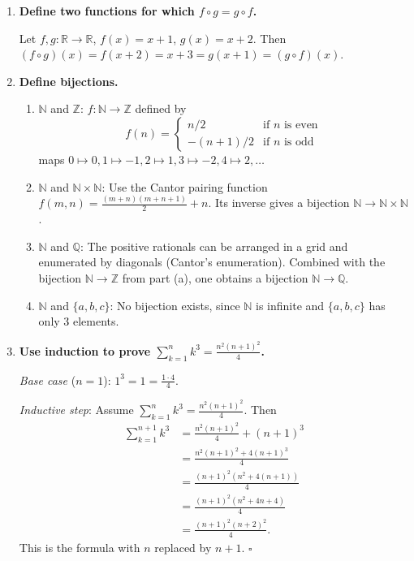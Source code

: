 \documentclass[11pt,openany]{book}
\def\NN{\mathbb{N}}
\def\RN{\mathbb{R}}
\def\ZN{\mathbb{Z}}
\def\QN{\mathbb{Q}}
\begin{document}
\begin{enumerate}[{0.}1. ]
Let $z \in Z$. Since $g$ is surjective, $\exists y \in Y$ with $g(y)=z$. Since $f$ is surjective, $\exists x \in X$ with $f(x)=y$. Then $(g\circ f)(x)=g(f(x))=g(y)=z$.

\item \textbf{Define two functions for which $f\circ g = g\circ f$.}

Let $f,g: \RN \to \RN$, $f(x) = x+1$, $g(x) = x+2$. Then $(f\circ g)(x) = f(x+2)=x+3 = g(x+1) = (g\circ f)(x)$.

\item \textbf{Define bijections.}

\begin{enumerate}
\item $\NN$ and $\ZN$: $f: \NN \to \ZN$ defined by
\[ f(n) = \begin{cases} n/2 & \text{if } n \text{ is even}\\ -(n+1)/2 & \text{if } n \text{ is odd}\end{cases} \]
maps $0\mapsto 0, 1\mapsto -1, 2\mapsto 1, 3\mapsto -2, 4\mapsto 2,\ldots$

\item $\NN$ and $\NN\times\NN$: Use the Cantor pairing function $f(m,n) = \frac{(m+n)(m+n+1)}{2}+n$. Its inverse gives a bijection $\NN \to \NN\times\NN$.

\item $\NN$ and $\QN$: The positive rationals can be arranged in a grid and enumerated by diagonals (Cantor's enumeration). Combined with the bijection $\NN \to \ZN$ from part (a), one obtains a bijection $\NN \to \QN$.

\item $\NN$ and $\{a,b,c\}$: No bijection exists, since $\NN$ is infinite and $\{a,b,c\}$ has only 3 elements.
\end{enumerate}

\item \textbf{Use induction to prove $\sum_{k=1}^n k^3 = \frac{n^2(n+1)^2}{4}$.}

\textit{Base case} ($n=1$): $1^3 = 1 = \frac{1\cdot 4}{4}$. \checkmark

\textit{Inductive step}: Assume $\sum_{k=1}^n k^3 = \frac{n^2(n+1)^2}{4}$. Then
\begin{align*}
\sum_{k=1}^{n+1} k^3 &= \frac{n^2(n+1)^2}{4} + (n+1)^3\\
&= \frac{n^2(n+1)^2 + 4(n+1)^3}{4}\\
&= \frac{(n+1)^2(n^2 + 4(n+1))}{4}\\
&= \frac{(n+1)^2(n^2+4n+4)}{4}\\
&= \frac{(n+1)^2(n+2)^2}{4}.
\end{align*}
This is the formula with $n$ replaced by $n+1$. $\square$


\end{enumerate}
\end{document}
